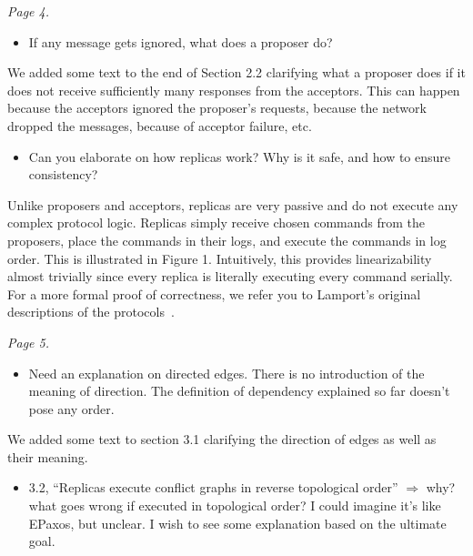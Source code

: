\documentclass[letterpaper,twocolumn,10pt]{article}
\newenvironment{reviewerquote}
{\list{}{\leftmargin=\parindent\rightmargin=0in}\item[] \itshape \color{ReviewerDarkGray}}%
{\endlist}
\begin{document}
\begin{reviewerquote}
  Page 4.

  \begin{itemize}
    \item
      If any message gets ignored, what does a proposer do?
  \end{itemize}
\end{reviewerquote}

We added some text to the end of Section 2.2 clarifying what a proposer does if
it does not receive sufficiently many responses from the acceptors. This can
happen because the acceptors ignored the proposer's requests, because the
network dropped the messages, because of acceptor failure, etc.

\begin{reviewerquote}
  \begin{itemize}
    \item
      Can you elaborate on how replicas work? Why is it safe, and how to ensure
      consistency?
  \end{itemize}
\end{reviewerquote}

Unlike proposers and acceptors, replicas are very passive and do not execute
any complex protocol logic. Replicas simply receive chosen commands from the
proposers, place the commands in their logs, and execute the commands in log
order. This is illustrated in Figure 1. Intuitively, this provides
linearizability almost trivially since every replica is literally executing
every command serially. For a more formal proof of correctness, we refer you to
Lamport's original descriptions of the protocols~\cite{lamport2001paxos,
lamport1998part}.

\begin{reviewerquote}
  Page 5.

  \begin{itemize}
    \item
      Need an explanation on directed edges. There is no introduction of the
      meaning of direction. The definition of dependency explained so far
      doesn't pose any order.
  \end{itemize}
\end{reviewerquote}

We added some text to section 3.1 clarifying the direction of edges as well as
their meaning.

\begin{reviewerquote}
  \begin{itemize}
    \item
      3.2, ``Replicas execute conflict graphs in reverse topological order''
      $\Rightarrow$ why? what goes wrong if executed in topological order? I
      could imagine it's like EPaxos, but unclear. I wish to see some
      explanation based on the ultimate goal.
  \end{itemize}
\end{reviewerquote}
\end{document}
